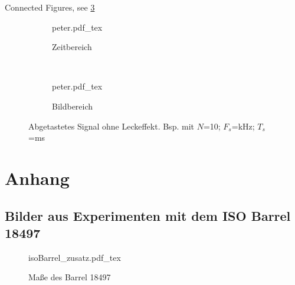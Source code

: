 \documentclass[12pt,
titlepage,
a4paper,
oneside,     %
openany,     %
listof=totoc,  %
numbers = noenddot, %
bibliography=totoc,    %
headsepline, %
]{scrbook} %
\begin{document}
Connected Figures, see \ref{fig:leck_toll}

\begin{figure}
	\centering
	\begin{subfigure}[b]{0.48\textwidth}
		\def\svgwidth{\columnwidth}
		{peter.pdf_tex}
		\caption{Zeitbereich}
		\label{leck_toll_t}
	\end{subfigure}
	~
	\begin{subfigure}[b]{0.48\textwidth}
		\def\svgwidth{\columnwidth}
		{peter.pdf_tex}
		\caption{Bildbereich}
		\label{leck_toll_f}
	\end{subfigure}
	\caption{Abgetastetes Signal ohne Leckeffekt. Bsp. mit $N$=10; $F_s$=\unit[1]{kHz}; $T_s$=\unit[10]{ms}}
	\label{fig:leck_toll}
\end{figure}


\printbibliography

\label{letzteSeite}
\appendix

\chapter{Anhang}
\label{cha_ausb}

\section{Bilder aus Experimenten mit dem ISO Barrel 18497}
\label{sec_bildiso}

\begin{figure}[h]
	\centering
	\def\svgwidth{1.0\columnwidth}
	{isoBarrel_zusatz.pdf_tex}
	\caption{Maße des Barrel 18497}
	\label{fig:isoBarrelExp}
\end{figure}
\end{document}
